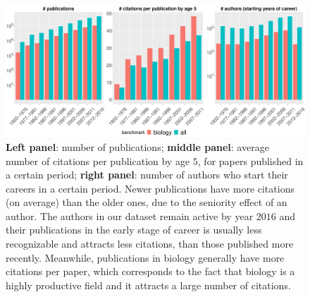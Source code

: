 \begin{refsection}
\begin{figure}[ht!]
    \centering
    \includegraphics[width=\textwidth]{figures/exploratory/npub_ncitperpub_naut.eps}
    \caption{\textbf{Left panel}: number of publications; \textbf{middle panel}: average number of citations per publication by age $5$, for papers published in a certain period; \textbf{right panel}: number of authors who start their careers in a certain period. Newer publications have more citations (on average) than the older ones, due to the seniority effect of an author. The authors in our dataset remain active by year $2016$ and their publications in the early stage of career is usually less recognizable and attracts less citations, than those published more recently. Meanwhile, publications in biology generally have more citations per paper, which corresponds to the fact that biology is a highly productive field and it attracts a large number of citations.}
    \label{fig:exploratory}
\end{figure}


\end{refsection}
